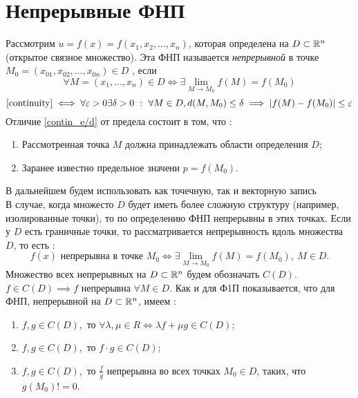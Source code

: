 \documentclass[../../main.tex]{subfiles}
\begin{document}
	
	\section{Непрерывные ФНП}	
	
	Рассмотрим $u = f(x) = f(x_1, x_2, \ldots, x_n)$, которая определена на 
	$D \subset \mathbb{R}^n$ (открытое связное множество). Эта ФНП называется
	\emph{непрерывной} в точке $M_0 = (x_{01}, x_{02}, \ldots, x_{0n}) \in D$
	, если
	\begin{equation}
	\label{continuity}
	\forall M = (x_1, \ldots, x_n) \in D \iff \exists 
	\lim\limits_{M \to M_0}f(M) = f(M_0)
	\end{equation}
	\begin{equation}
	\label{contin_e/d}
	\eqref{continuity} \iff \forall \eps > 0 \exists \delta > 0 \ : \ 
	\forall M \in D
	, d(M, M_0) \leq \delta \implies |f(M) - f(M_0)| \leq \eps
	\end{equation}
	Отличие \eqref{contin_e/d} от предела состоит в том, что :
	\begin{enumerate}
		\item  Рассмотренная точка $M$ должна принадлежать области 
		       определения $D$;
		\item Заранее известно предельное значени $p = f(M_0)$.
	\end{enumerate}
    В дальнейшем будем использовать как точечную, так и векторную запись\\
    В случае, когда множесто $D$ будет иметь более сложную структуру 
    (например, изолированные точки), то по определению ФНП непрерывны в этих
    точках. Если у $D$ есть граничные точки, то рассматривается непрерывность 
    вдоль множества $D$, то есть :
    \[
      f(x) \text{ непрерывна в точке } M_0 \iff \exists \lim\limits_{M \to M_0}
       f(M) = f(M_0), \ M \in D.
    \]
    Множество всех непрерывных на $D \subset \mathbb{R}^n$ будем обозначать $C(D)$.
    $f \in C(D) \implies f$ непрерывна $\forall M \in D$. Как и для Ф1П 
    показывается, что для ФНП, непрерывной на $D \subset \mathbb{R}^n$, имеем :
    \begin{enumerate}
    	\item $f, g \in C(D),$ то $\forall \lambda, \mu \in R \iff 
    	      \lambda f + \mu g \in C(D)$;
    	\item $f, g \in C(D),$ то $f \cdot g \in C(D)$;
    	\item $f, g \in C(D),$ то $\frac{f}{g}$ непрерывна  во всех точках 
    	      $M_0 \in D$, таких, что  $g(M_0) != 0$.
    \end{enumerate}
\end{document}

